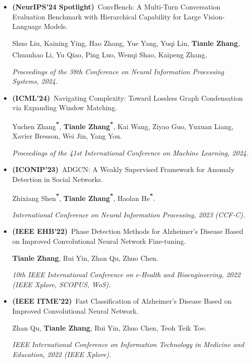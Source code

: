 \documentclass[10pt,a4paper]{article}
\newcommand{\me}[1]{\textbf{#1}}
\newcommand{\eq}{\textsuperscript{\textbf{*}}}
\newcommand{\corr}{\textsuperscript{\textbf{\dag}}}
\begin{document}
\begin{itemize}[leftmargin=1.4em, itemsep=4pt]
  \item \textbf{(NeurIPS'24 Spotlight)}~ConvBench: A Multi-Turn Conversation Evaluation Benchmark with Hierarchical Capability for Large Vision-Language Models.\par
        Shuo Liu, Kaining Ying, Hao Zhang, Yue Yang, Yuqi Lin, \me{Tianle Zhang}, Chuanhao Li, Yu Qiao, Ping Luo, Wenqi Shao\corr, Kaipeng Zhang\corr.\par
        \textit{Proceedings of the 38th Conference on Neural Information Processing Systems, 2024.}

  \item \textbf{(ICML'24)}~Navigating Complexity: Toward Lossless Graph Condensation via Expanding Window Matching.\par
        Yuchen Zhang\eq, \me{Tianle Zhang}\eq, Kai Wang, Ziyao Guo, Yuxuan Liang, Xavier Bresson, Wei Jin, Yang You.\par
        \textit{Proceedings of the 41st International Conference on Machine Learning, 2024.}

  \item \textbf{(ICONIP'23)}~ADGCN: A Weakly Supervised Framework for Anomaly Detection in Social Networks.\par
        Zhixiang Shen\eq, \me{Tianle Zhang}\eq\corr, Haolan He\eq.\par
        \textit{International Conference on Neural Information Processing, 2023 (CCF-C).}

  \item \textbf{(IEEE EHB'22)}~Phase Detection Methods for Alzheimer's Disease Based on Improved Convolutional Neural Network Fine-tuning.\par
        \me{Tianle Zhang}, Rui Yin, Zhan Qu, Zhuo Chen.\par
        \textit{10th IEEE International Conference on e-Health and Bioengineering, 2022 (IEEE Xplore, SCOPUS, WoS).}

  \item \textbf{(IEEE ITME'22)}~Fast Classification of Alzheimer's Disease Based on Improved Convolutional Neural Network.\par
        Zhan Qu, \me{Tianle Zhang}, Rui Yin, Zhuo Chen, Teoh Teik Toe.\par
        \textit{IEEE International Conference on Information Technology in Medicine and Education, 2022 (IEEE Xplore).}

\end{itemize}

\end{document}
